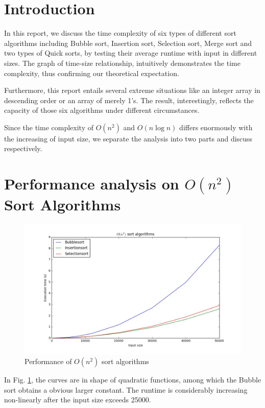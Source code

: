 
\section{Introduction}
In this report, we discuss the time complexity of six types of different sort algorithms including Bubble sort, Insertion sort, Selection sort, Merge sort and two types of Quick sorts, by testing their average runtime with input in different sizes.  The graph of time-size relationship, intuitively demonstrates the time complexity, thus confirming our theoretical expectation.

Furthermore, this report entails several extreme situations like an integer array in descending order or an array of merely 1's. The result, interestingly, reflects the capacity of those six algorithms under different circumstances.

Since the time complexity of $O(n^2)$ and $O(n\log n)$ differs enormously with the increasing of input size, we separate the analysis into two parts and discuss respectively.

\section{Performance analysis on $O(n^2)$ Sort Algorithms}
\begin{figure}[H]
    \centering
    \includegraphics[width=0.8\linewidth]{../a1/012}
    \caption{Performance of $O(n^2)$ sort algorithms}\label{012}
\end{figure}
In Fig. \ref{012}, the curves are in shape of quadratic functions, among which the Bubble sort obtains a obvious larger constant. The runtime is considerably increasing non-linearly after the input size exceeds 25000.

